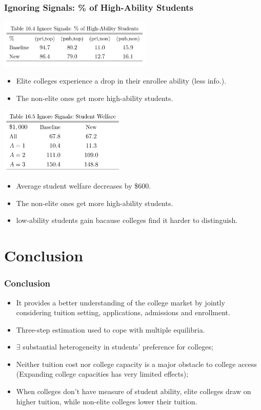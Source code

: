 \documentclass[10pt]{beamer}
\begin{document}
\begin{frame}[c]\frametitle{Ignoring Signals: \% of High-Ability Students}

\centerline{\includegraphics[width=0.55\textwidth]{table164.png}}
\begin{itemize}
    \small
    \item  Elite colleges experience a drop in their enrollee ability (less info.).
    \item  The non-elite ones get more high-ability students.
\end{itemize}
\centerline{\includegraphics[width=0.45\textwidth]{table165.png}}
\begin{itemize}
    \small
    \item  Average student welfare decreases by \$600.
    \item  The non-elite ones get more high-ability students.
    \item  low-ability students gain bacause colleges find it harder to distinguish.
\end{itemize}

\end{frame}

\section{Conclusion}
\begin{frame}[c]\frametitle{Conclusion}

\begin{itemize}
    \item It provides a better understanding of the college market by jointly considering tuition setting, applications, admissions and enrollment.
    \item Three-step estimation used to cope with multiple equilibria.
    \item $\exists$ substantial heterogeneity in students' preference for colleges;
    \item Neither tuition cost nor college capacity is a major obstacle to college access (Expanding college capacities has very limited effects);
    \item  When colleges don't have measure of student ability, elite colleges draw on higher tuition, while non-elite colleges lower their tuition.
\end{itemize}


\end{frame}
\end{document}
